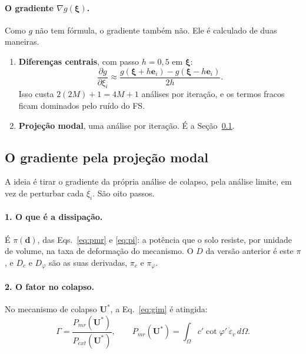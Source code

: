 \documentclass[11pt,a4paper]{article}
\newcommand{\xib}{\bm\xi}
\begin{document}
\paragraph{O gradiente $\nabla g(\xib)$.} Como $g$ não tem fórmula, o gradiente também não. Ele é calculado de
duas maneiras.
\begin{enumerate}
  \item \textbf{Diferenças centrais}, com passo $h = 0{,}5$ em $\xib$:
    \begin{equation}
      \frac{\partial g}{\partial \xi_i} \approx \frac{g(\xib + h\bm e_i) - g(\xib - h\bm e_i)}{2h}.
      \label{eq:difc}
    \end{equation}
    Isso custa $2(2M) + 1 = 4M + 1$ análises por iteração, e os termos fracos ficam dominados pelo ruído do FS.
  \item \textbf{Projeção modal}, uma análise por iteração. É a Seção~\ref{sec:gradmodal}.
\end{enumerate}

\subsection{O gradiente pela projeção modal}\label{sec:gradmodal}
A ideia é tirar o gradiente da própria análise de colapso, pela análise limite, em vez de perturbar cada $\xi_i$. São oito
passos.

\paragraph{1. O que é a dissipação.} É $\pi(\bm d)$, das Eqs.~\eqref{eq:pmr} e \eqref{eq:pi}: a potência que o solo
resiste, por unidade de volume, na taxa de deformação do mecanismo. O $D$ da versão anterior é este $\pi$, e $D_c$ e
$D_\varphi$ são as suas derivadas, $\pi_c$ e $\pi_\varphi$.

\paragraph{2. O fator no colapso.} No mecanismo de colapso $\bm U^*$, a Eq.~\eqref{eq:gim} é atingida:
\begin{equation}
  \Gamma = \frac{P_{mr}(\bm U^*)}{P_{ext}(\bm U^*)}, \qquad P_{mr}(\bm U^*) = \int_\Omega c'\cot\varphi'\,\dot\varepsilon_v\,d\Omega.
  \label{eq:gamma_colapso}
\end{equation}
\end{document}
